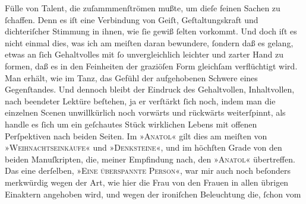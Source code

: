 \begin{ledgroupsized}[t]{13cm}
                    Fülle von Talent, die zuſammmenſtrömen mußte, um dieſe feinen Sachen zu
                    ſchaffen. Denn es iſt eine Verbindung von Geiſt, Geſtaltungskraft und
                    dichteriſcher Stimmung in ihnen, wie ſie gewiß ſelten vorkommt. Und doch iſt es
                    nicht einmal dies, was ich am meiſten {\pb}daran bewundere, ſondern daß es gelang, etwas an ſich Gehaltvolles mit ſo
                    unvergleichlich leichter und zarter Hand zu formen, daß es in den Feinheiten der
                    graziöſen Form gleichſam verflüchtigt wird. Man erhält, wie im Tanz, das Gefühl
                    der aufgehobenen Schwere eines Gegenſtandes. Und dennoch bleibt der Eindruck des
                    Gehaltvollen, Inhaltvollen, nach beendeter Lektüre beſtehen, ja er verſtärkt
                    ſich noch, indem man die einzelnen Scenen unwillkürlich noch vorwärts und
                    rückwärts weiterſpinnt, als handle es ſich um ein geſchautes Stück wirklichen
                    Lebens mit offenen Perſpektiven nach beiden Seiten. Im »\textsc{Anatol}« gilt dies am meiſten von »\textsc{Weihnachtseinkäufe}« und »\textsc{Denksteine}«, und im höchſten Grade von den beiden Manuſkripten, die, meiner
                    Empfindung nach, den »\textsc{Anatol}« übertreffen. Das eine derſelben, »\textsc{Eine überspannte Person}«, war mir auch noch beſonders merkwürdig wegen der Art, wie hier die
                    Frau von den Frauen {\pb}in allen übrigen
                    Einaktern angehoben wird, und wegen der ironiſchen Beleuchtung die, ſchon vom

\end{ledgroupsized}
